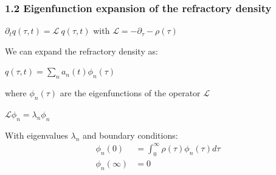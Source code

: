 \documentclass{beamer}
\begin{document}
\begin{frame}
\frametitle{1.2 Eigenfunction expansion of the refractory density}



\hspace{1cm} $\partial_t q(\tau,t)=\mathcal{L}\:q(\tau,t)$ \hspace{1cm} with \hspace{1cm}  $\mathcal{L}=-\partial_{\tau}-\rho(\tau)$ 


\vspace{0.3cm}
We can expand the refractory density as:

\vspace{0.2cm}
\hspace{3.1cm}
$q(\tau,t)=\sum_n a_n(t)\phi_n(\tau) $

\pause
\vspace{0.3cm}
where $\phi_n(\tau)$ are the eigenfunctions of the operator $\mathcal{L}$

\vspace{0.2cm}
 \hspace{2.4cm} \hspace{1cm}$
\mathcal{L}\phi_n=\lambda_n\phi_n
$

\vspace{0.3cm}
With eigenvalues $\lambda_n$ and boundary conditions:
\begin{align}
\phi_n(0)&=\int_{0}^{\infty}\rho(\tau)\phi_n(\tau)d\tau \nonumber\\
\phi_n(\infty)&=0 \nonumber
\end{align}


\end{frame}
\end{document}
